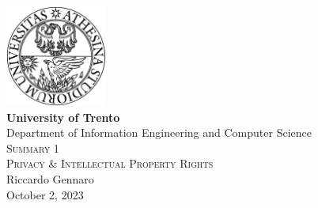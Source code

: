 \pagestyle{plain}

\thispagestyle{empty}

\begin{center}

  \includegraphics[width=0.25\textwidth]{I-initFolder/images/TrentoLOGO_2.png}\\[0.5cm]

  \textbf{\Large\textbf{University of Trento}}\\[0.5cm]

  Department of Information Engineering and Computer Science\\[4cm]

  \textsc{\huge Summary 1}\\[0.5cm]

  \textsc{Privacy \& Intellectual Property Rights}\\[1.5cm]

  Riccardo Gennaro\\[0.5cm]

  {October 2, 2023}

\end{center}%
